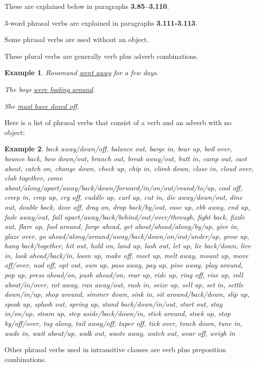 \documentclass[oneside]{book}
\numberwithin{equation}{section}
\newtheorem{example}{Example}[section]
\begin{document}
These are explained below in paragraphs \textbf{3.85--3.110}.

3-word phrasal verbs are explained in paragraphs \textbf{3.111-3.113}.

%
\noindent{} Some phrasal verbs are used without an object.

These plural verbs are generally verb plus adverb combinations.
\begin{example}
    Rosamund \underline{went away} for a few days.
    
    The boys \underline{were fooling around}.
    
    She \underline{must have dozed off}.
\end{example}
%
\noindent{} Here is a list of phrasal verbs that consist of a verb and an adverb with no object:
\begin{example}
    back away/down/off, balance out, barge in, bear up, boil over, bounce back, bow down/out, branch out, break away/out, butt in, camp out, cast about, catch on, change down, check up, chip in, climb down, close in, cloud over, club together, come about/along/apart/away/back/down/forward/in/on/out/round/to/up, cool off, creep in, crop up, cry off, cuddle up, curl up, cut in, die away/down/out, dine out, double back, doze off, drag on, drop back/by/out, ease up, ebb away, end up, fade away/out, fall apart/away/back/behind/out/over/through, fight back, fizzle out, flare up, fool around, forge ahead, get about/ahead/along/by/up, give in, glaze over, go ahead/along/around/away/back/down/on/out/under/up, grow up, hang back/together, hit out, hold on, land up, lash out, let up, lie back/down, live in, look ahead/back/in, loom up, make off, meet up, melt away, mount up, move off/over, nod off, opt out, own up, pass away, pay up, pine away, play around, pop up, press ahead/on, push ahead/on, rear up, ride up, ring off, rise up, roll about/in/over, rot away, run away/out, rush in, seize up, sell up, set in, settle down/in/up, shop around, simmer down, sink in, sit around/back/down, slip up, speak up, splash out, spring up, stand back/down/in/out, start out, stay in/on/up, steam up, step aside/back/down/in, stick around, stock up, stop by/off/over, tag along, tail away/off, taper off, tick over, touch down, tune in, wade in, wait about/up, walk out, waste away, watch out, wear off, weigh in
\end{example}
%
\noindent{} Other phrasal verbs used in intransitive clauses are verb plus preposition combinations.
\end{document}
